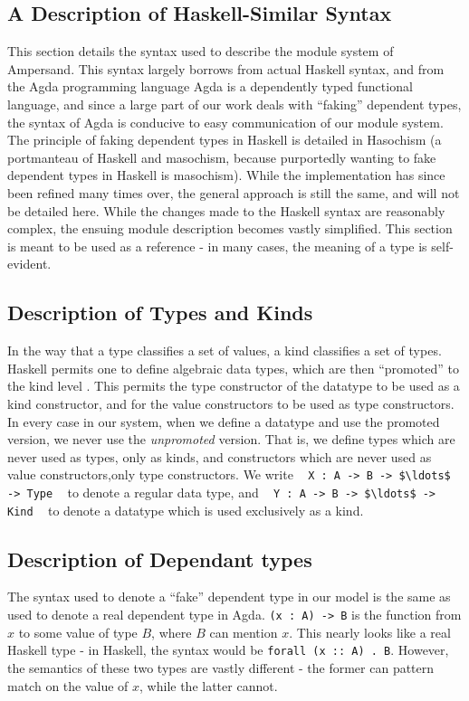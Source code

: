 \noindent
\subsection{A Description of Haskell-Similar Syntax}\label{subsec:HaskellSyntax}

This section details the syntax used to describe the module system of
Ampersand. This syntax largely borrows from actual Haskell syntax, and from the
Agda programming language%
 Agda is a dependently typed functional
language, and since a large part of our work deals with ``faking'' dependent
types, the syntax of Agda is conducive to easy communication of our module 
system. The
principle of faking dependent types in Haskell is detailed in
Hasochism \citep{hasochism} 
(a portmanteau of Haskell and masochism, because
purportedly wanting to fake dependent types in Haskell is masochism). While the
implementation has since been refined many times over, the general approach is 
still the
same, and will not be detailed here.
While the changes made to the Haskell syntax are reasonably complex, the 
ensuing 
module description becomes vastly simplified. This section is meant to be used
as a reference - in many cases, the meaning of a type is self-evident. 

\noindent
\subsection{Description of Types and Kinds}
In the way that a type classifies a set of values, a kind classifies a set of
types. Haskell permits one to define algebraic data types, which are then 
``promoted''
to the kind level \citep{promotion}. 
This permits the type constructor of the datatype to be used
as a kind constructor, and for the value constructors to be used as type 
constructors. In every case in our system, when we define a datatype and use 
the promoted version, we never use the \emph{unpromoted} version. That is, we 
define types which are never used as types, only as kinds, and constructors 
which are never used as value constructors,only type constructors. We write 
\,\,\,
\lstinline!X : A -> B -> $\ldots$ -> Type!
\,\,\, 
to denote a regular data type, and 
\,\,\,
\lstinline!Y : A -> B -> $\ldots$ -> Kind!
\,\,\, 
to denote a datatype
which is used exclusively as a kind. 

\noindent
\subsection{Description of Dependant types}
The syntax used to denote a ``fake'' dependent type in our model is the same 
as used to denote a real dependent type in Agda. \lstinline!(x : A) -> B! is 
the function
from $x$ to some value of type $B$, where $B$ can mention $x$. This nearly 
looks like a 
real Haskell type - in Haskell, the syntax would be \texttt{forall (x :: A) . 
B}. However, 
the semantics of these two types are vastly different - the former can pattern 
match
on the value of $x$, while the latter cannot. 


